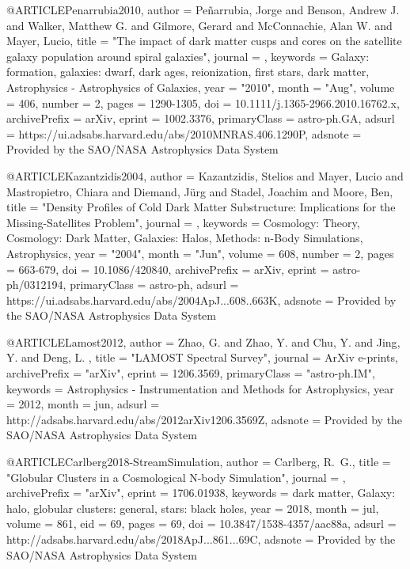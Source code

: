 \documentclass[apj]{emulateapj}
\begin{document}
{{@ARTICLE{Penarrubia2010,
       author = {{Pe{\~n}arrubia}, Jorge and {Benson}, Andrew J. and
         {Walker}, Matthew G. and {Gilmore}, Gerard and {McConnachie}, Alan W. and
         {Mayer}, Lucio},
        title = "{The impact of dark matter cusps and cores on the satellite galaxy population around spiral galaxies}",
      journal = {\mnras},
     keywords = {Galaxy: formation, galaxies: dwarf, dark ages, reionization, first stars, dark matter, Astrophysics - Astrophysics of Galaxies},
         year = "2010",
        month = "Aug",
       volume = {406},
       number = {2},
        pages = {1290-1305},
          doi = {10.1111/j.1365-2966.2010.16762.x},
archivePrefix = {arXiv},
       eprint = {1002.3376},
 primaryClass = {astro-ph.GA},
       adsurl = {https://ui.adsabs.harvard.edu/abs/2010MNRAS.406.1290P},
      adsnote = {Provided by the SAO/NASA Astrophysics Data System}
}



@ARTICLE{Kazantzidis2004,
       author = {{Kazantzidis}, Stelios and {Mayer}, Lucio and {Mastropietro}, Chiara and
         {Diemand}, J{\"u}rg and {Stadel}, Joachim and {Moore}, Ben},
        title = "{Density Profiles of Cold Dark Matter Substructure: Implications for the Missing-Satellites Problem}",
      journal = {\apj},
     keywords = {Cosmology: Theory, Cosmology: Dark Matter, Galaxies: Halos, Methods: n-Body Simulations, Astrophysics},
         year = "2004",
        month = "Jun",
       volume = {608},
       number = {2},
        pages = {663-679},
          doi = {10.1086/420840},
archivePrefix = {arXiv},
       eprint = {astro-ph/0312194},
 primaryClass = {astro-ph},
       adsurl = {https://ui.adsabs.harvard.edu/abs/2004ApJ...608..663K},
      adsnote = {Provided by the SAO/NASA Astrophysics Data System}
}



@ARTICLE{Lamost2012,
   author = {{Zhao}, G. and {Zhao}, Y. and {Chu}, Y. and {Jing}, Y. and {Deng}, L.
	},
    title = "{LAMOST Spectral Survey}",
  journal = {ArXiv e-prints},
archivePrefix = "arXiv",
   eprint = {1206.3569},
 primaryClass = "astro-ph.IM",
 keywords = {Astrophysics - Instrumentation and Methods for Astrophysics},
     year = 2012,
    month = jun,
   adsurl = {http://adsabs.harvard.edu/abs/2012arXiv1206.3569Z},
  adsnote = {Provided by the SAO/NASA Astrophysics Data System}
}

@ARTICLE{Carlberg2018-StreamSimulation,
   author = {{Carlberg}, R.~G.},
    title = "{Globular Clusters in a Cosmological N-body Simulation}",
  journal = {\apj},
archivePrefix = "arXiv",
   eprint = {1706.01938},
 keywords = {dark matter, Galaxy: halo, globular clusters: general, stars: black holes},
     year = 2018,
    month = jul,
   volume = 861,
      eid = {69},
    pages = {69},
      doi = {10.3847/1538-4357/aac88a},
   adsurl = {http://adsabs.harvard.edu/abs/2018ApJ...861...69C},
  adsnote = {Provided by the SAO/NASA Astrophysics Data System}
}



}}
\end{document}
